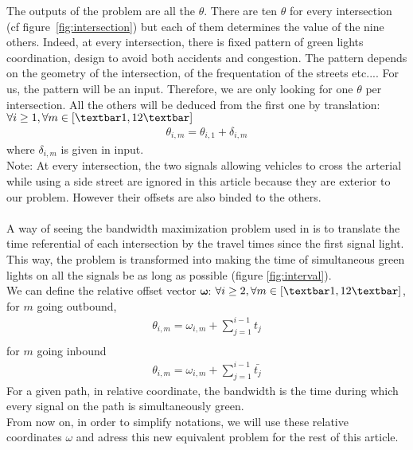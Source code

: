 The outputs of the problem are all the $\theta$. There are ten $\theta$ for every intersection (cf figure~\ref{fig:intersection}) but each of them determines the value of the nine others. Indeed, at every intersection, there is fixed pattern of green lights coordination, design to avoid both accidents and congestion. The pattern depends on the geometry of the intersection, of the frequentation of the streets etc.... For us, the pattern will be an input. Therefore, we are only looking for one $\theta$ per intersection. All the others will be deduced from the first one by translation:\\
$\forall i \geq 1, \forall m \in [\textbar 1,12 \textbar]$
\begin{align*}
\theta_{i,m}=\theta_{i,1} + \delta_{i,m}
\end{align*}
where $\delta_{i,m}$ is given in input.\\
Note: At every intersection, the two signals allowing vehicles to cross the arterial while using a side street are ignored in this article because they are exterior to our problem. However their offsets are also binded to the others.
\\ \\
A way of seeing the bandwidth maximization problem used in \cite{bandmax} is to translate the time referential of each intersection by the travel times since the first signal light. This way, the problem is transformed into making the time of simultaneous green lights on all the signals be as long as possible (figure \ref{fig:interval}).\\
We can define the relative offset vector $\mathbf{\omega}$:
$\forall i \geq 2, \forall m \in [\textbar 1,12 \textbar]$,\\
for $m$ going outbound,
\begin{align*}
\theta_{i,m} = \omega_{i,m} + \sum_{j=1}^{i-1} t_j\\
\end{align*}
for $m$ going inbound
\begin{align*}
\theta_{i,m} = \omega_{i,m} + \sum_{j=1}^{i-1} \bar{t_j}
\end{align*}
For a given path, in relative coordinate, the bandwidth is the time during which every signal on the path is simultaneously green.\\
From now on, in order to simplify notations, we will use these relative coordinates $\omega$ and adress this new equivalent problem for the rest of this article.